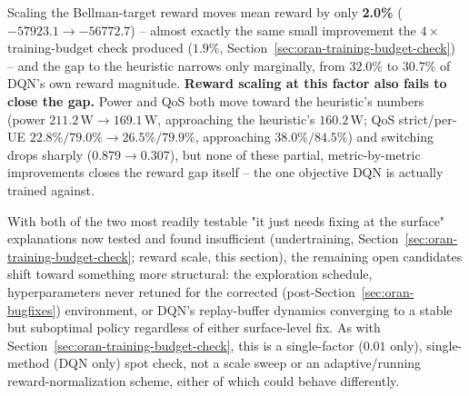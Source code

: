 \begin{table}[htbp]
\centering
\caption{DQN with its Bellman-target reward scaled by $0.01$ vs.\ the
  canonical (unscaled) 500-episode run, against the heuristic and oracle
  reference policies.}
\label{tab:oran-reward-scale-check}
\end{table}

Scaling the Bellman-target reward moves mean reward by only
\textbf{2.0\%} ($-57923.1 \to -56772.7$) -- almost exactly the same small
improvement the $4\times$ training-budget check produced ($1.9\%$,
Section~\ref{sec:oran-training-budget-check}) -- and the gap to the
heuristic narrows only marginally, from $32.0\%$ to $30.7\%$ of DQN's own
reward magnitude. \textbf{Reward scaling at this factor also fails to
close the gap.} Power and QoS both move toward the heuristic's numbers
(power $211.2\,\mathrm{W} \to 169.1\,\mathrm{W}$, approaching the
heuristic's $160.2\,\mathrm{W}$; QoS strict/per-UE $22.8\%/79.0\% \to
26.5\%/79.9\%$, approaching $38.0\%/84.5\%$) and switching drops sharply
($0.879 \to 0.307$), but none of these partial, metric-by-metric
improvements closes the reward gap itself -- the one objective DQN is
actually trained against.

With both of the two most readily testable "it just needs fixing at the
surface" explanations now tested and found insufficient (undertraining,
Section~\ref{sec:oran-training-budget-check}; reward scale, this
section), the remaining open candidates shift toward something more
structural: the exploration schedule, hyperparameters never retuned for
the corrected (post-Section~\ref{sec:oran-bugfixes}) environment, or DQN's
replay-buffer dynamics converging to a stable but suboptimal policy
regardless of either surface-level fix. As with
Section~\ref{sec:oran-training-budget-check}, this is a single-factor
($0.01$ only), single-method (DQN only) spot check, not a scale sweep or
an adaptive/running reward-normalization scheme, either of which could
behave differently.

